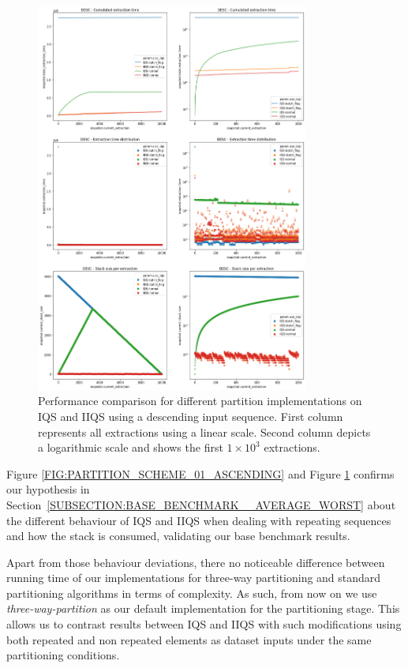\begin{figure}[!ht]
    \centering
    \includegraphics[width=0.8\textwidth]{./fragments/04_experimental_execution/images/02_basebenchmark_03_sort_d_case.png}
    \caption{Performance comparison for different partition implementations on IQS and IIQS using a descending input sequence. First column represents all extractions using a linear scale. Second column depicts a logarithmic scale and shows the first $1\times10^3$ extractions.}
    \label{FIG:PARTITION_SCHEME_01_DESCENDING}
\end{figure}

Figure \ref{FIG:PARTITION_SCHEME_01_ASCENDING} and Figure \ref{FIG:PARTITION_SCHEME_01_DESCENDING} confirms our hypothesis in Section~\ref{SUBSECTION:BASE_BENCHMARK__AVERAGE_WORST} about the different behaviour of IQS and IIQS when dealing with repeating sequences and how the stack is consumed, validating our base benchmark results.

Apart from those behaviour deviations, there no noticeable difference between running time of our implementations for three-way partitioning and standard partitioning algorithms in terms of complexity. As such, from now on we use \textit{three-way-partition} as our default implementation for the partitioning stage. This allows us to contrast results between IQS and IIQS with such modifications using both repeated and non repeated elements as dataset inputs under the same partitioning conditions.

\FloatBarrier